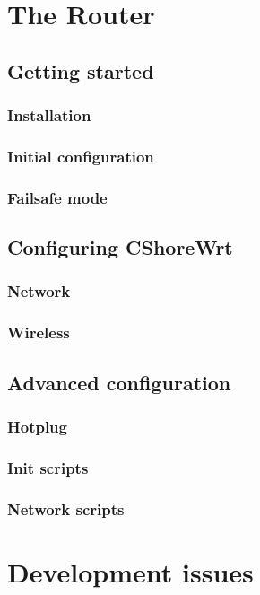 \documentclass[a4paper]{book}
\begin{document}
\tableofcontents
\chapter{The Router}
  \section{Getting started}
    \subsection{Installation}
    \subsection{Initial configuration}
    \subsection{Failsafe mode}
  \section{Configuring CShoreWrt}
    \subsection{Network}
      
    \subsection{Wireless}
      
  \section{Advanced configuration}
    
    \subsection{Hotplug}
    \subsection{Init scripts}
      
    \subsection{Network scripts}
      
\chapter{Development issues}
\end{document}
